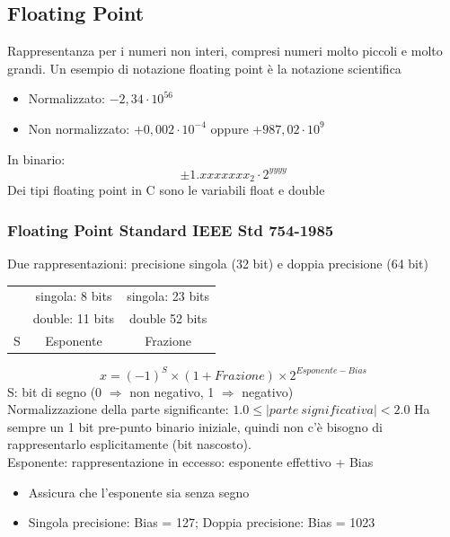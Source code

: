 \documentclass[12pt,a4paper]{article}
\begin{document}
\subsection{Floating Point}
Rappresentanza per i numeri non interi, compresi numeri molto piccoli e molto grandi. Un esempio di notazione floating point è la notazione scientifica
\begin{itemize}
\item Normalizzato: $-2,34 \cdot 10^{56}$
\item Non normalizzato: $+0,002 \cdot 10^{-4}$ oppure $+987,02 \cdot 10^9$
\end{itemize}
In binario:
$$ \pm 1.xxxxxxx_2 \cdot 2^{yyyy}$$
Dei tipi floating point in C sono le variabili float e double

\subsubsection{Floating Point Standard IEEE Std 754-1985}
Due rappresentazioni: precisione singola (32 bit) e doppia precisione (64 bit)
\begin{center}
\begin{tabular}{ccc}
 & singola: 8 bits & singola: 23 bits\\
 & double: 11 bits & double 52 bits\\ \hline
 \multicolumn{1}{|c|}{S} & \multicolumn{1}{c|}{Esponente} & \multicolumn{1}{c|}{Frazione}\\ \hline
\end{tabular}
\end{center}
$$x = (-1)^S \times (1+Frazione) \times 2^{Esponente - Bias}$$
S: bit di segno (0 $\Rightarrow$ non negativo, 1 $\Rightarrow$ negativo)\\
Normalizzazione della parte significante: $1.0 \leq |parte\ significativa| < 2.0$
Ha sempre un 1 bit pre-punto binario iniziale, quindi non c'è bisogno di rappresentarlo esplicitamente (bit nascosto).\\
Esponente: rappresentazione in eccesso: esponente effettivo + Bias
\begin{itemize}
\item Assicura che l'esponente sia senza segno
\item Singola precisione: Bias = 127; Doppia precisione: Bias = 1023
\end{itemize}
\end{document}
